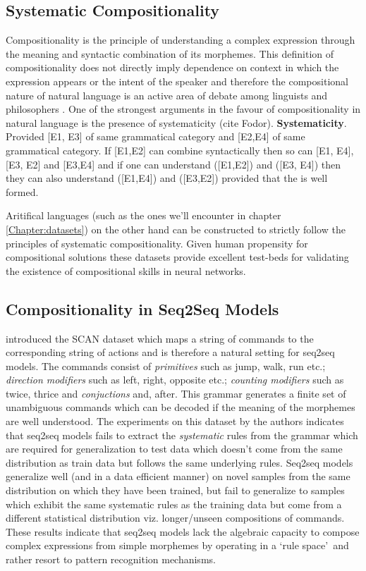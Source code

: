 \subsection{Systematic Compositionality} \label{systematic}
Compositionality is the principle of understanding a complex expression through the meaning and syntactic combination of its morphemes. This definition of compositionality does not directly imply dependence on context in which the expression appears or the intent of the speaker and therefore the compositional nature of natural language is an active area of debate among linguists and philosophers \citep{sep-compositionality}. One of the strongest arguments in the favour of compositionality in natural language is the presence of systematicity (cite Fodor). 
%
\textbf{Systematicity}. Provided [E1, E3] of same grammatical category and [E2,E4] of same grammatical category. If [E1,E2] can combine syntactically then so can [E1, E4], [E3, E2] and [E3,E4] and if one can understand ([E1,E2]) and ([E3, E4]) then they can also understand ([E1,E4]) and ([E3,E2]) provided that the is well formed.

Aritifical languages (such as the ones we'll encounter in chapter \ref{Chapter:datasets}) on the other hand can be constructed to strictly follow the principles of systematic compositionality. Given human propensity for compositional solutions \citep{NIPS2016_6130} these datasets provide excellent test-beds for validating the existence of compositional skills in neural networks. 

\subsection{Compositionality in Seq2Seq Models}
\cite{Lake2017} introduced the SCAN dataset which maps a string of commands to the corresponding string of actions and is therefore a natural setting for seq2seq models. The commands consist of \textit{primitives} such as jump, walk, run etc.; \textit{direction modifiers} such as left, right, opposite etc.; \textit{counting modifiers} such as twice, thrice and \textit{conjuctions} and, after. This grammar generates a finite set of unambiguous commands which can be decoded if the meaning of the morphemes are well understood. The experiments on this dataset by the authors indicates that seq2seq models fails to extract the \textit{systematic} rules from the grammar which are required for generalization to test data which doesn't come from the same distribution as train data but follows the same underlying rules. Seq2seq models generalize well (and in a data efficient manner) on novel samples from the same distribution on which they have been trained, but fail to generalize to samples which exhibit the same systematic rules as the training data but come from a different statistical distribution viz. longer/unseen compositions of commands. These results indicate that seq2seq models lack the algebraic capacity to compose complex expressions from simple morphemes by operating in a \lq rule space{}\rq\ and rather resort to pattern recognition mechanisms.

